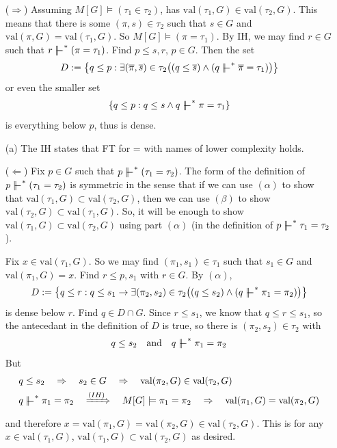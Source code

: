 \documentclass[12pt,a4paper]{article}
\newenvironment{proof}
{\begin{changemargin}{0.5cm}{0.5cm} 
	}%
	{\end{changemargin}
}
\newenvironment{p}
{\begin{proof} 
	}%
	{\end{proof}
}
\begin{document}
\begin{p}
\begin{itemize}
($\Rightarrow$) Assuming $M[G] \models (\tau_1 \in \tau_2)$, has $\text{val}(\tau_1, G) \in \text{val}(\tau_2, G)$. This means that there is some $(\pi, s) \in \tau_2$ such that $s\in G$ and $\text{val}(\pi, G) = \text{val}(\tau_1, G)$. So $M[G] \models(\pi = \tau_1)$. By IH, we may find $r \in G$ such that $r \forces^* (\pi = \tau_1)$. Find $p\leq s,r$, $p\in G$. Then the set
\begin{align*}
D:= \big\{q\leq p : \exists (\bar{\pi}, \bar{s}) \in \tau_2 \big( (q\leq \bar{s}) \wedge (q\forces^* \bar{\pi} =\tau_1) \big) \big\}
\end{align*}
or even the smaller set
\begin{align*}
\{q\leq p :  q\leq s \wedge q\forces^* \pi = \tau_1 \}
\end{align*}
is everything below $p$, thus is dense.
\item[(a)] The IH states that FT for = with names of lower complexity holds.

($\Leftarrow$) Fix $p\in G$ such that $p\forces^* (\tau_1 =\tau_2)$. The form of the definition of $p\forces^* (\tau_1 = \tau_2)$ is symmetric in the sense that if we can use $(\alpha)$ to show that $\text{val}(\tau_1, G) \subset \text{val}(\tau_2, G)$, then we can use $(\beta)$ to show $\text{val}(\tau_2, G) \subset \text{val}(\tau_1, G)$. So, it will be enough to show $\text{val}(\tau_1, G) \subset \text{val}(\tau_2, G)$ using part $(\alpha)$ (in the definition of $p\forces^* \tau_1 =\tau_2$).

\quad Fix $x\in \text{val}(\tau_1, G)$. So we may find $(\pi_1, s_1) \in \tau_1$ such that $s_1\in G$ and $\text{val}(\pi_1, G) =x$. Find $r\leq p, s_1$ with $r\in G$. By $(\alpha)$,
\begin{align*}
D:= \big\{ q\leq r: q\leq s_1 \rightarrow \exists (\pi_2, s_2) \in \tau_2 \big( (q\leq s_2) \wedge (q\forces^* \pi_1 =\pi_2) \big) \big\}
\end{align*}
is dense below $r$. Find $q\in D \cap G$. Since $r\leq s_1$, we know that $q\leq r\leq s_1$, so the antecedant in the definition of $D$ is true, so there is $(\pi_2, s_2) \in \tau_2$ with
\begin{align*}
q\leq s_2 \quad \text{and} \quad q\forces^* \pi_1 = \pi_2
\end{align*}
But
\begin{align*}
& q\leq s_2 \quad  \Rightarrow  \quad s_2 \in G \quad \Rightarrow \quad \text{val}(\pi_2, G) \in \text{val}(\tau_2, G) \\
& q\forces^* \pi_1= \pi_2 \quad \xRightarrow{(IH)} \quad M[G] \models \pi_1 = \pi_2 \quad \Rightarrow \quad \text{val}(\pi_1, G) = \text{val}(\pi_2, G) 
\end{align*}
and therefore $x =\text{val}(\pi_1, G) =\text{val}(\pi_2, G)\in \text{val}(\tau_2, G)$. This is for any $x\in \text{val}(\tau_1, G)$, $\text{val}(\tau_1, G) \subset \text{val}(\tau_2, G)$ as desired.
\s


\end{itemize}
\end{p}
\end{document}
